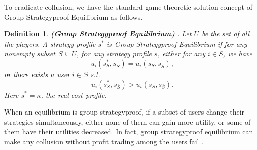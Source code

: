 \documentclass[conference]{IEEEtran}
\newtheorem{definition}{Definition}
\theoremstyle{definition}
\begin{document}
{%

To eradicate collusion, we have the standard game theoretic solution concept of Group Strategyproof Equilibrium as follows.}
\begin{definition}
\label{def:gse}
\textbf{(Group Strategyproof Equilibrium)} \cite{jain1999group} \cite{moulin2001strategyproof}. Let $U$ be the set of all the players. A strategy profile $s^*$ is Group Strategyproof Equilibrium if for any nonempty subset $S\subseteq U$, for any strategy profile $s$, either for any $i\in S$, we have
\begin{equation}
u_i(s_S^*,s_{\overline{S}})=u_i(s_S,s_{\overline{S}}),
\end{equation}
or there exists a user $i\in S$ s.t.
\begin{equation}
u_i(s_S^*,s_{\overline{S}})>u_i(s_S,s_{\overline{S}}).
\end{equation}
Here $s^*=\kappa$, the real cost profile.
\end{definition}
When an equilibrium is group strategyproof, if a subset of users change their strategies simultaneously, either none of them can gain more utility, or some of them have their utilities decreased. In fact, group strategyproof equilibrium can make any collusion without profit trading among the users fail \cite{zhong2007designing}.
\end{document}
